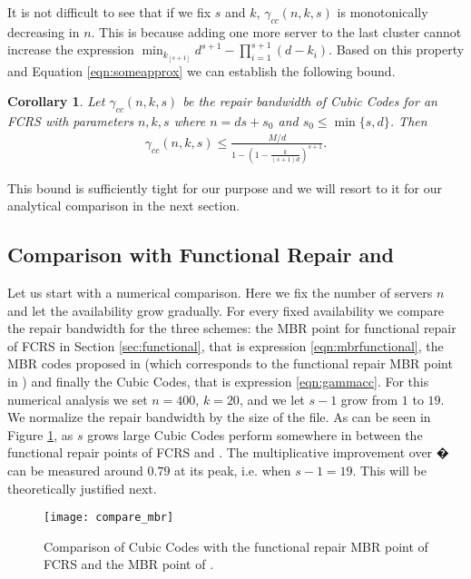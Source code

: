 \documentclass[journal,onecolumn,draftcls]{IEEEtran}
\newtheorem{corollary}{Corollary}
\begin{document}
It is not difficult to see that if we fix $s$ and $k$, $\gamma_{cc}(n,k,s)$ is monotonically decreasing in $n$. This is because adding one more server to the last cluster cannot increase the expression $\min_{k_{[s+1]}} d^{s+1}-\prod_{i=1}^{s+1} (d-k_i)$. Based on this property and Equation \eqref{eqn:someapprox} we can establish the following bound. 
\begin{corollary} Let $\gamma_{cc}(n,k,s)$ be the repair bandwidth of Cubic Codes for an FCRS with parameters $n,k,s$  where $n = ds + s_0$ and $s_0\le\min\{s,d\}$. Then
 \begin{eqnarray*} 
 \gamma_{cc}(n,k,s) \le \frac{{M}/d}{1-(1 -\frac{k}{(s+1)d})^{s+1}}.
  \end{eqnarray*}
  \end{corollary}
This bound is sufficiently tight for our purpose and we will resort to it for our analytical comparison in the next section.

\subsection{Comparison with Functional Repair and  \cite{rashmi2009explicit}}
\label{sec:cubiccomparison}
Let us start with a numerical comparison. Here we fix the number of servers $n$ and let the availability grow gradually. For every fixed availability we compare the repair bandwidth for the three schemes: the MBR point for functional repair of FCRS in Section \ref{sec:functional},  that is expression \eqref{eqn:mbrfunctional}, the MBR codes proposed in \cite{rashmi2009explicit} (which corresponds to the functional repair MBR point in \cite{dimakis2010network}) and finally the Cubic Codes, that is expression \eqref{eqn:gammacc}.  For this numerical analysis we set $n = 400$,  $k = 20$, and we let $s-1$ grow from $1$ to $19$. We normalize the repair bandwidth by the size of the file. As can be seen in Figure \ref{fig:compare_mbr}, as $s$ grows large Cubic Codes perform somewhere in between the functional repair points of FCRS and \cite{dimakis2010network}.  The multiplicative improvement over \cite{dimakis2010network}� can be measured around $0.79$ at its peak, i.e. when $s -1 = 19$. This will be theoretically justified next.
\begin{figure}[h]
\centering
\texttt{[image: compare\_mbr]}
\caption{Comparison of Cubic Codes with the functional repair MBR point  of FCRS and the MBR point of \cite{dimakis2010network}.}
\label{fig:compare_mbr}
\end{figure}
\end{document}
